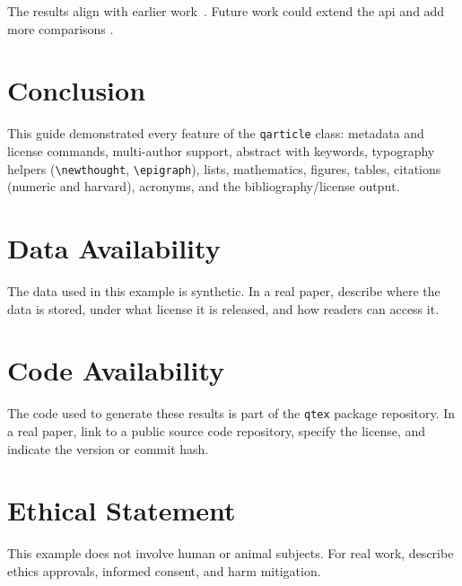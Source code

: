 \documentclass[sans,oneside,numeric,raggedright]{qarticle}
\begin{document}
\lipsum[6-7]

The results align with earlier work~\citep{example-book,example-paper}.
Future work could extend the \gls{api} and add more comparisons
\citep{example-conf}.

\section{Conclusion}

This guide demonstrated every feature of the \texttt{qarticle} class:
metadata and license commands, multi-author support, abstract with keywords,
typography helpers (\verb|\newthought|, \verb|\epigraph|), lists,
mathematics, figures, tables, citations (numeric and harvard), acronyms,
and the bibliography/license output.

\lipsum[8]


\section*{Data Availability}

The data used in this example is synthetic.  In a real paper, describe
where the data is stored, under what license it is released, and how
readers can access it.

\section*{Code Availability}

The code used to generate these results is part of the \texttt{qtex}
package repository.  In a real paper, link to a public source code
repository, specify the license, and indicate the version or commit hash.

\section*{Ethical Statement}

This example does not involve human or animal subjects.  For real work,
describe ethics approvals, informed consent, and harm mitigation.

\printauthors

\printglossary[type=\acronymtype]

\label{sec:bibliography}
\end{document}

